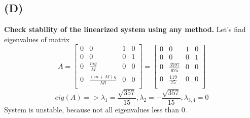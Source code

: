 \documentclass[a4paper,11pt]{article}
\theoremstyle{mytheor}
\begin{document}
\subsection*{(D)}
\textbf{Check stability of the linearized system using any method.}\newline
Let's find eigenvalues of matrix
\[
A=
\begin{bmatrix}
0&0&1&0\\
0&0&0&1\\
0&\frac{mg}{M}&0&0\\
0&\frac{(m+M)g}{Ml}&0&0\\
\end{bmatrix}
=
\begin{bmatrix}
0&0&1&0\\
0&0&0&1\\
0&\frac{3597}{625}&0&0\\
0&\frac{119}{75}&0&0\\
\end{bmatrix}
\]
\[
eig(A)=>
\lambda_{1}=\frac{\sqrt{357}}{15}, \lambda_{2}=-\frac{\sqrt{357}}{15}, \lambda_{3,4}=0
\]
System is unstable, because not all eigenvalues less than $0$.
\end{document}

